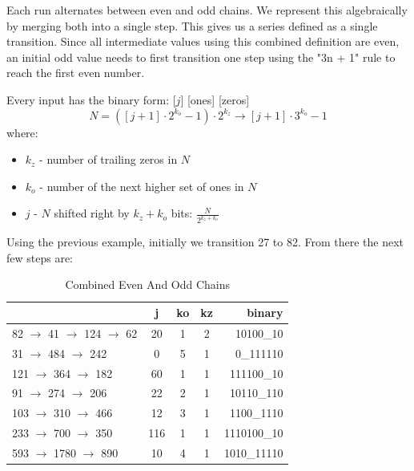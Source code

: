 \documentclass[preprint]{sigplanconf}
\begin{document}
Each run alternates between even and odd chains. We represent this algebraically by merging both into a single step. This gives us a series defined as a single transition. Since all intermediate values using this combined definition are even, an initial odd value needs to first transition one step using the "3n + 1" rule to reach the first even number.

Every input has the binary form: [$j$] [ones] [zeros]
\[
    N = ([j + 1] \cdot 2^{k_o} - 1) \cdot 2^{k_z} \rightarrow [j + 1] \cdot 3^{k_o} - 1
\]
where:
\begin{itemize}
    \item $k_z$ - number of trailing zeros in $N$
    \item $k_o$ - number of the next higher set of ones in $N$
    \item $j$ - $N$ shifted right by $k_z + k_o$ bits: $\frac{N}{2^{k_z + k_o}}$
\end{itemize}

Using the previous example, initially we transition 27 to 82. From there the next few steps are:

\begin{table} [ht]
    \begin{center}
        \begin{tabular}{|l|c|c|c|r|}
            \hline
                                                        & \textbf{j} & \textbf{ko} & \textbf{kz} & \textbf{binary} \\
            \hline
            \phantom{1}82 $\to$ 41  $\to$  124 $\to$ 62 & 20         & 1           & 2           & 10100\_10       \\
            \hline
            \phantom{1}31  $\to$  484 $\to$ 242         & 0          & 5           & 1           & 0\_111110       \\
            \hline
            121 $\to$  364 $\to$ 182                    & 60         & 1           & 1           & 111100\_10      \\
            \hline
            \phantom{1}91 $\to$  274 $\to$ 206          & 22         & 2           & 1           & 10110\_110      \\
            \hline
            103 $\to$  310 $\to$ 466                    & 12         & 3           & 1           & 1100\_1110      \\
            \hline
            233 $\to$  700 $\to$ 350                    & 116        & 1           & 1           & 1110100\_10     \\
            \hline
            593 $\to$ 1780 $\to$ 890                    & 10         & 4           & 1           & 1010\_11110     \\
            \hline
        \end{tabular}
        \caption{Combined Even And Odd Chains}
        \label{tab-2}
    \end{center}
\end{table}
\end{document}

